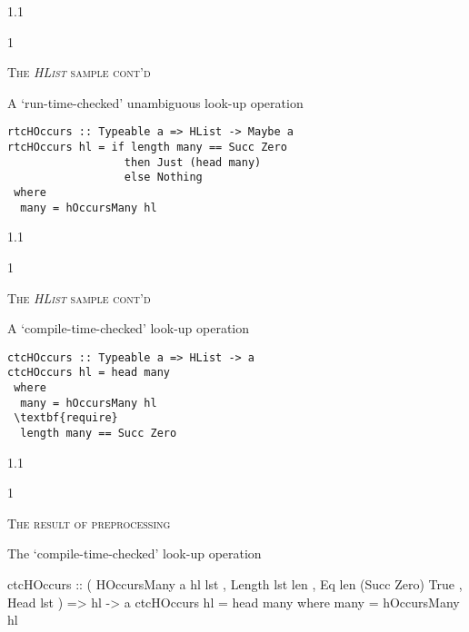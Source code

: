 \documentclass{slides}
\newcommand{\header}[1]{{\large\scshape \color{Red} #1} \medskip }
\newcommand{\blau}[1]{{\color{Blue} #1} \medskip }
\newenvironment{myslide}{\begin{slide}\color{Blue}\begin{boxedminipage}{1.1\hsize}\begin{boxedminipage}{1\hsize}\color{Black}
\vspace{-170\in}
}{%
\smallskip
\end{boxedminipage}
\end{boxedminipage}
\end{slide}}
\begin{document}



\begin{myslide}

\header{The \emph{HList} sample cont'd}

\blau{A `run-time-checked' unambiguous look-up operation}

\medskip

\begin{Verbatim}[fontseries=normal,fontsize=\small,commandchars=\\\{\}]
rtcHOccurs :: Typeable a => HList -> Maybe a
rtcHOccurs hl = if length many == Succ Zero 
                  then Just (head many)
                  else Nothing
 where
  many = hOccursMany hl
\end{Verbatim}

\end{myslide}






\begin{myslide}

\header{The \emph{HList} sample cont'd}

\blau{A `compile-time-checked' look-up operation}

\medskip

\begin{Verbatim}[fontseries=normal,fontsize=\small,commandchars=\\\{\}]
ctcHOccurs :: Typeable a => HList -> a
ctcHOccurs hl = head many
 where
  many = hOccursMany hl
 \textbf{require}
  length many == Succ Zero
\end{Verbatim}

\end{myslide}






\begin{myslide}

\header{The result of preprocessing}

\blau{The `compile-time-checked' look-up operation}

{\small

\begin{code}
ctcHOccurs :: ( HOccursMany a hl lst
              , Length lst len
              , Eq len (Succ Zero) True
              , Head lst
              )
           => hl -> a
ctcHOccurs hl = head many
 where
  many = hOccursMany hl
\end{code}

}

\end{myslide}
\end{document}
